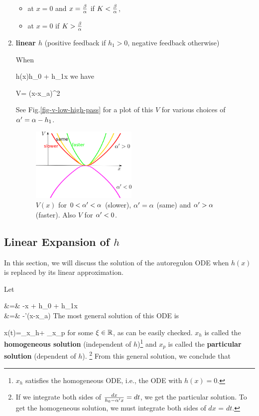 \begin{enumerate}
\begin{itemize}[$\checkmark$]
\item at $x=0$ and $x=\frac{\beta}{\alpha}$ if $K<\frac{\beta}{\alpha}$,

\item at $x=0$ if $K>\frac{\beta}{\alpha}$

\end{itemize}


\item {\bf linear $h$} (positive feedback if $h_1>0$,
negative feedback otherwise)

When

\beq
h(x)\approx h_0 + h_1x
\eeq
we have

\beq
V= (x-x_a)^2
\eeq

See Fig.\ref{fig-v-low-high-pass}
for a plot of this $V$ for various 
choices of $\alpha'=\alpha-h_1$.

\begin{figure}[h!]
\centering
\includegraphics[width=2in]
{autoregulons/v-faster-same-slower.png}
\caption{$V(x)$ for 
$0<\alpha'<\alpha$ (slower),
$\alpha'=\alpha$ (same) and
$\alpha'>\alpha$ (faster).
Also $V$ for $\alpha'<0$.}
\label{v-faster-same-slower}
\end{figure}
 
\end{enumerate}

\subsection{Linear Expansion of $h$}

In this section, we will
discuss the solution of
the autoregulon ODE
when $h(x)$ is replaced by
its linear approximation.

Let 

\beqa
{} &=& -\alp x + h_0 + h_1x
\\
&=& -\alp'(x-x_a)
\eeqa
The most general solution of this ODE is

\beq
x(t)=_{x_h}+
_{x_p}
\eeq
for some $\xi\in{ \mathbb{R}}$, as can be easily checked.
$x_h$ is called the {\bf homogeneous solution} (independent of $h$)\footnote{
$x_h$ satisfies the homogeneous ODE, i.e., the
ODE with $h(x)=0$.
}
and $x_p$ is called the {\bf particular solution} (dependent of $h$).
\footnote{
If we integrate both sides of
$\frac{dx}{h_0 -\alpha' x}=dt$,
we get the particular solution.
To get the homogeneous 
solution,
we must integrate both sides
of $dx$ = $dt$.}
From this general solution, we conclude that

